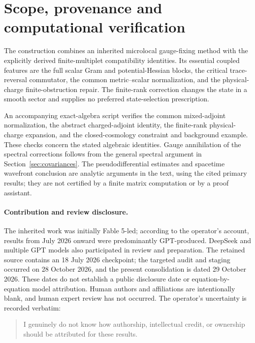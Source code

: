 \documentclass[11pt]{article}
\theoremstyle{definition}
\begin{document}

\setcounter{equation}{32}



\section{Scope, provenance and computational verification}
The construction combines an inherited microlocal gauge-fixing method with the explicitly derived finite-multiplet compatibility identities.
Its essential coupled features are the full scalar Gram and potential-Hessian blocks, the critical trace-reversal commutator, the common metric--scalar normalization, and the physical-charge finite-obstruction repair.
The finite-rank correction changes the state in a smooth sector and supplies no preferred state-selection prescription.

An accompanying exact-algebra script verifies the common mixed-adjoint normalization, the abstract charged-adjoint identity, the finite-rank physical-charge expansion, and the closed-cosmology constraint and background example.
These checks concern the stated algebraic identities.
Gauge annihilation of the spectral corrections follows from the general spectral argument in Section~\ref{sec:covariances}.
The pseudodifferential estimates and spacetime wavefront conclusion are analytic arguments in the text, using the cited primary results; they are not certified by a finite matrix computation or by a proof assistant.

\begin{samepage}
\paragraph{Contribution and review disclosure.}
The inherited work was initially Fable 5-led; according to the operator's account, results from July 2026 onward were predominantly GPT-produced.
DeepSeek and multiple GPT models also participated in review and preparation.
The retained source contains an 18 July 2026 checkpoint; the targeted audit and staging occurred on 28 October 2026, and the present consolidation is dated 29 October 2026.
These dates do not establish a public disclosure date or equation-by-equation model attribution.
Human authors and affiliations are intentionally blank, and human expert review has not occurred.
The operator's uncertainty is recorded verbatim:
\begin{quote}
I genuinely do not know how authorship, intellectual credit, or ownership should be attributed for these results.
\end{quote}
\end{samepage}

\begingroup
\footnotesize


\endgroup
\end{document}
